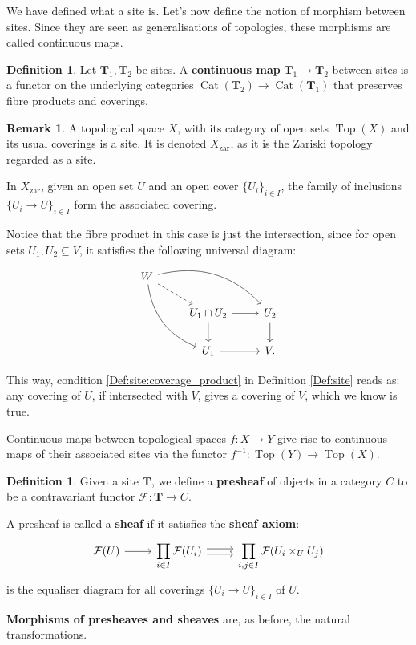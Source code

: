 \documentclass{report}
\DeclareMathOperator{\Top}{Top}
\DeclareMathOperator{\Cat}{Cat}
\theoremstyle{definition}
\newtheorem{definition}[equation]{Definition}
\newtheorem{remark}[equation]{Remark}
\begin{document}
We have defined what a site is. Let's now define the notion of morphism between sites. Since they are seen as generalisations of topologies, these morphisms are called continuous maps.

\begin{definition}
Let $\boldsymbol{T}_1,\boldsymbol{T}_2$ be sites. A \textbf{continuous map} $\boldsymbol{T}_1\rightarrow\boldsymbol{T}_2$ between sites is a functor on the underlying categories $\Cat(\boldsymbol{T}_2)\rightarrow\Cat(\boldsymbol{T}_1)$ that preserves fibre products and coverings.
\end{definition}

\begin{remark}
A topological space $X$, with its category of open sets $\Top(X)$ and its usual coverings is a site. It is denoted $X_{\text{zar}}$, as it is the Zariski topology regarded as a site.

In $X_{\text{zar}}$, given an open set $U$ and an open cover $\{U_i\}_{i\in I}$, the family of inclusions $\{U_i\rightarrow U\}_{i\in I}$ form the associated covering.

Notice that the fibre product in this case is just the intersection, since for open sets $U_1,U_2\subseteq V$, it satisfies the following universal diagram:
\[
\begin{tikzcd}
W\arrow[rrd,bend left]\arrow[rdd,bend right]\arrow[rd,dashed]\\
&U_1\cap U_2\arrow[r]\arrow[d]&U_2\arrow[d]\\
&U_1\arrow[r]&V.
\end{tikzcd}
\]

This way, condition \ref{Def:site:coverage_product} in Definition \ref{Def:site} reads as: any covering of $U$, if intersected with $V$, gives a covering of $V$, which we know is true.
\vspace{2mm}

Continuous maps between topological spaces $f:X\rightarrow Y$ give rise to continuous maps of their associated sites via the functor $f^{-1}:\Top(Y)\rightarrow\Top(X)$.
\end{remark}

\begin{definition}
Given a site $\boldsymbol{T}$, we define a \textbf{presheaf} of objects in a category $C$ to be a contravariant functor $\mathcal{F}:\boldsymbol{T}\rightarrow C$.

A presheaf is called a \textbf{sheaf} if it satisfies the \textbf{sheaf axiom}:
\[
\begin{tikzcd}
\mathcal{F}(U)\arrow[r]&\displaystyle{\prod_{i\in I}\mathcal{F}(U_i)}\arrow[r,shift left]\arrow[r,shift right]&\displaystyle{\prod_{i,j\in I}\mathcal{F}(U_i\times_UU_j)}
\end{tikzcd}
\]
is the equaliser diagram for all coverings $\{U_i\rightarrow U\}_{i\in I}$ of $U$.

\textbf{Morphisms of presheaves and sheaves} are, as before, the natural transformations.
\end{definition}
\end{document}
